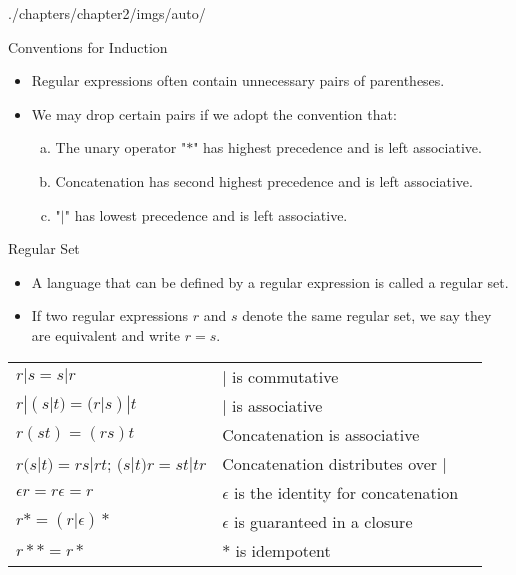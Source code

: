 \begin{graphicspathcontext}{{./chapters/chapter2/imgs/auto/}}
\begin{bibunit}[apalike]
\begin{frame}{Conventions for Induction}
	\begin{itemize}
	\item Regular expressions often contain unnecessary pairs of parentheses.
	\vfill
	\item We may drop certain pairs if we adopt the convention that:
		\begin{enumerate}[a)]
		\item The unary operator "$*$" has highest precedence and is left associative.
		\item Concatenation has second highest precedence and is left associative.
		\item "$|$" has lowest precedence and is left associative.
		\end{enumerate}
	\end{itemize}
\end{frame}

\begin{frame}{Regular Set}
	\begin{itemize}
	\item A language that can be defined by a regular expression is called a regular set.
	\item If two regular expressions $r$ and $s$ denote the same regular set, we say they are equivalent and write $r = s$.
	\end{itemize}
	\vfill
	\begin{smaller}
	\begin{tabularx}{\linewidth}{|X|X|X|}
	\hline
	\tabularheading\chead{Law}&\chead{Description} \\
	\hline
	$r|s = s|r$ & $|$ is commutative \\
	\hline
	$r|(s|t) = (r|s)|t$ & $|$ is associative \\
	\hline
	$r(st) = (rs)t$ & Concatenation is associative \\
	\hline
	$r(s|t) = rs|rt$; $(s|t)r = st|tr$ & Concatenation distributes over $|$ \\
	\hline
	$\epsilon r = r\epsilon = r$ & $\epsilon$ is the identity for concatenation \\
	\hline
	$r* = (r|\epsilon)*$ & $\epsilon$ is guaranteed in a closure \\
	\hline
	$r** = r*$ & $*$ is idempotent \\
	\hline
	\end{tabularx}
	\end{smaller}
\end{frame}


\end{bibunit}
\end{graphicspathcontext}
